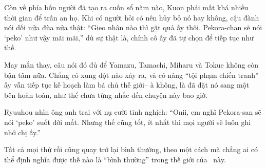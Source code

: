 \documentclass[../main.tex]{subfiles}
\begin{document}
Còn về phía bốn người đã tạo ra cuốn sổ năm nào, Kuon phải mất khá nhiều thời gian để trấn an họ. Khi có người hỏi có nên hủy bỏ nó hay không, cậu đành nói dối nửa đùa nửa thật: ``Gieo nhân nào thì gặt quả ấy thôi. Pekora-chan sẽ nói `peko' như vậy mãi mãi,'' dù sự thật là, chính cô ấy đã tự chọn để tiếp tục như thế.

May mắn thay, câu nói đó đủ để Yamazu, Tamachi, Miharu và Tokue không còn bận tâm nữa. Chẳng có xung đột nào xảy ra, và cô nàng ``tội phạm chiến tranh'' ấy vẫn tiếp tục kế hoạch làm bá chủ thế giới-- à không, là đã đặt nó sang một bên hoàn toàn, như thể chưa từng nhắc đến chuyện này bao giờ.

Ryuuhou nhìn ông anh trai với nụ cười tinh nghịch: ``Onii, em nghĩ Pekora-san sẽ nói `peko' suốt đời mất. Nhưng thế cũng tốt, ít nhất thì mọi người sẽ luôn ghi nhớ chị ấy.''

Tất cả mọi thứ rồi cũng quay trở lại bình thường, theo một cách mà chẳng ai có thể định nghĩa được thế nào là ``bình thường'' trong thế giới của \hll\ này.
\end{document}
